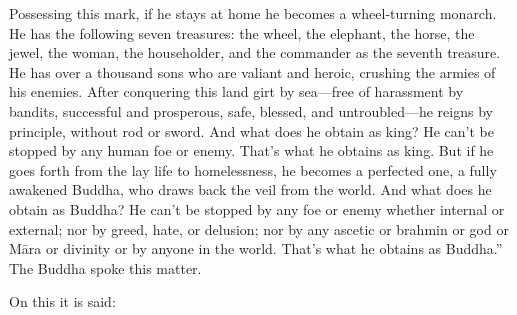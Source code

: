 \documentclass[12pt,openany]{book}%
\begin{document}
Possessing this mark, if he stays at home he becomes a wheel-turning monarch. He has the following seven treasures: the wheel, the elephant, the horse, the jewel, the woman, the householder, and the commander as the seventh treasure. He has over a thousand sons who are valiant and heroic, crushing the armies of his enemies. After conquering this land girt by sea—free of harassment by bandits, successful and prosperous, safe, blessed, and untroubled—he reigns by principle, without rod or sword. And what does he obtain as king? He can’t be stopped by any human foe or enemy. That’s what he obtains as king. But if he goes forth from the lay life to homelessness, he becomes a perfected one, a fully awakened Buddha, who draws back the veil from the world. And what does he obtain as Buddha? He can’t be stopped by any foe or enemy whether internal or external; nor by greed, hate, or delusion; nor by any ascetic or brahmin or god or \textsanskrit{Māra} or divinity or by anyone in the world. That’s what he obtains as Buddha.” The Buddha spoke this matter. 

On this it is said: 
\end{document}
